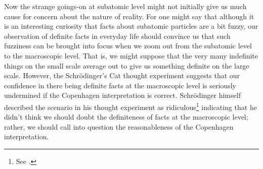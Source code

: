 \documentclass[12pt]{report}
\begin{document}
Now the strange goings-on at subatomic level might not initially give us much cause for concern about the nature of reality. For one might say that although it is an interesting curiosity that facts about subatomic particles are a bit fuzzy, our observation of definite facts in everyday life should convince us that such fuzziness can be brought into focus when we zoom out from the subatomic level to the macroscopic level. That is, we might suppose that the very many indefinite things on the small scale average out to give us something definite on the large scale. However, the Schr\"{o}dinger's Cat thought experiment suggests that our confidence in there being definite facts at the macroscopic level is seriously undermined if the Copenhagen interpretation is correct. Schr\"{o}dinger himself described the scenario in his thought experiment as ridiculous\footnote{See \cite[p. 328]{SchrondingerEnglish}.} indicating that he didn't think we should doubt the definiteness of facts at the macroscopic level; rather, we should call into question the reasonableness of the Copenhagen interpretation. 
\end{document}
